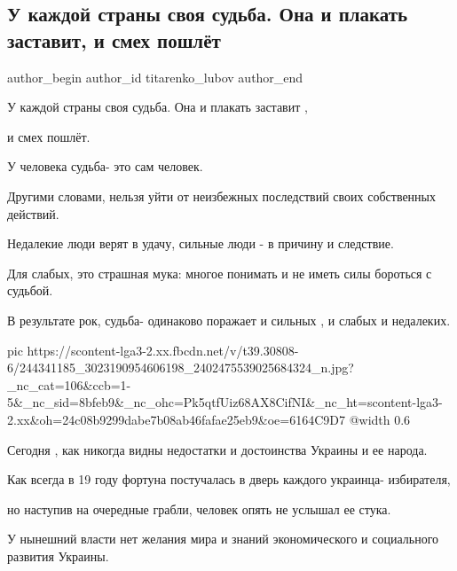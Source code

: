  
 
 
 
 
 
\subsection{У каждой страны своя судьба. Она и плакать заставит, и смех пошлёт}
\label{sec:06_10_2021.fb.titarenko_lubov.1.strana_sudjba}
 
\ifcmt
 author_begin
   author_id titarenko_lubov
 author_end
\fi

У каждой страны своя судьба. Она и плакать заставит , 

и смех пошлёт. 

У человека судьба- это сам человек.

Другими словами, нельзя уйти от неизбежных последствий своих  собственных
действий.

Недалекие люди верят в удачу, сильные люди - в причину и следствие.

Для слабых, это страшная мука: многое понимать и не иметь силы бороться с
судьбой.

В результате  рок, судьба- одинаково  поражает и сильных , и слабых и
недалеких. 

\ifcmt
  pic https://scontent-lga3-2.xx.fbcdn.net/v/t39.30808-6/244341185_3023190954606198_2402475539025684324_n.jpg?_nc_cat=106&ccb=1-5&_nc_sid=8bfeb9&_nc_ohc=Pk5qtfUiz68AX8CifNI&_nc_ht=scontent-lga3-2.xx&oh=24c08b9299dabe7b08ab46fafae25eb9&oe=6164C9D7
  @width 0.6
\fi

Сегодня , как никогда видны недостатки и достоинства Украины и ее народа. 

Как всегда  в 19 году фортуна  постучалась в дверь каждого украинца-
избирателя,

но наступив на очередные грабли,  человек опять не услышал ее стука.

У нынешний власти нет желания  мира и знаний экономического и социального
развития Украины. 

